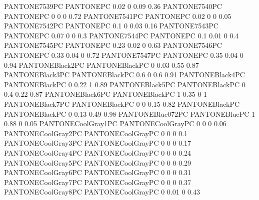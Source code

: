  {PANTONE7539PC} {PANTONE\SpotSpace PC} {0.02 0 0.09 0.36}
 {PANTONE7540PC} {PANTONE\SpotSpace PC} {0 0 0 0.72}
 {PANTONE7541PC} {PANTONE\SpotSpace PC} {0.02 0 0 0.05}
 {PANTONE7542PC} {PANTONE\SpotSpace PC} {0.1 0 0.03 0.16}
 {PANTONE7543PC} {PANTONE\SpotSpace PC} {0.07 0 0 0.3}
 {PANTONE7544PC} {PANTONE\SpotSpace PC} {0.1 0.01 0 0.4}
 {PANTONE7545PC} {PANTONE\SpotSpace PC} {0.23 0.02 0 0.63}
 {PANTONE7546PC} {PANTONE\SpotSpace PC} {0.33 0.04 0 0.72}
 {PANTONE7547PC} {PANTONE\SpotSpace PC} {0.35 0.04 0 0.94}
 {PANTONEBlack2PC} {PANTONE\SpotSpace Black\SpotSpace PC} {0 0.03 0.55 0.87}
 {PANTONEBlack3PC} {PANTONE\SpotSpace Black\SpotSpace PC} {0.6 0 0.6 0.91}
 {PANTONEBlack4PC} {PANTONE\SpotSpace Black\SpotSpace PC} {0 0.22 1 0.89}
 {PANTONEBlack5PC} {PANTONE\SpotSpace Black\SpotSpace PC} {0 0.4 0.22 0.87}
 {PANTONEBlack6PC} {PANTONE\SpotSpace Black\SpotSpace PC} {1 0.35 0 1}
 {PANTONEBlack7PC} {PANTONE\SpotSpace Black\SpotSpace PC} {0 0 0.15 0.82}
 {PANTONEBlackPC} {PANTONE\SpotSpace Black\SpotSpace PC} {0 0.13 0.49 0.98}
 {PANTONEBlue072PC} {PANTONE\SpotSpace Blue\SpotSpace PC} {1 0.88 0 0.05}
 {PANTONECoolGray1PC} {PANTONE\SpotSpace Cool\SpotSpace Gray\SpotSpace PC} {0 0 0 0.06}
 {PANTONECoolGray2PC} {PANTONE\SpotSpace Cool\SpotSpace Gray\SpotSpace PC} {0 0 0 0.1}
 {PANTONECoolGray3PC} {PANTONE\SpotSpace Cool\SpotSpace Gray\SpotSpace PC} {0 0 0 0.17}
 {PANTONECoolGray4PC} {PANTONE\SpotSpace Cool\SpotSpace Gray\SpotSpace PC} {0 0 0 0.24}
 {PANTONECoolGray5PC} {PANTONE\SpotSpace Cool\SpotSpace Gray\SpotSpace PC} {0 0 0 0.29}
 {PANTONECoolGray6PC} {PANTONE\SpotSpace Cool\SpotSpace Gray\SpotSpace PC} {0 0 0 0.31}
 {PANTONECoolGray7PC} {PANTONE\SpotSpace Cool\SpotSpace Gray\SpotSpace PC} {0 0 0 0.37}
 {PANTONECoolGray8PC} {PANTONE\SpotSpace Cool\SpotSpace Gray\SpotSpace PC} {0 0.01 0 0.43}
